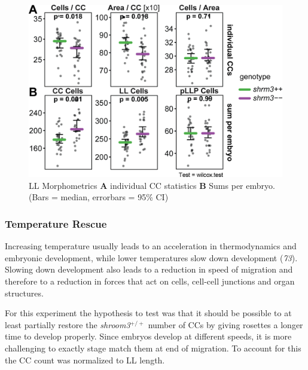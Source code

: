 \documentclass[11pt,singlespacinge,twoside]{reedthesis} %
\theoremstyle{definition}
\theoremstyle{definition}
\theoremstyle{definition}
\theoremstyle{remark}
\begin{document}
\begin{figure}[H]

{\centering \includegraphics[width=0.65\linewidth]{figures/results/01_morphometrics/ll_clusters} 

}

\caption[LL Morphometrics]{LL Morphometrics \textbf{A} individual CC statistics \textbf{B} Sums per embryo. (Bars = median, errorbars = 95\% CI)}\label{fig:llclus}
\end{figure}
\hypertarget{res-tempresc}{%
\subsubsection{Temperature Rescue}\label{res-tempresc}}

Increasing temperature usually leads to an acceleration in thermodynamics and embryonic development, while lower temperatures slow down development (\emph{73}). Slowing down development also leads to a reduction in speed of migration and therefore to a reduction in forces that act on cells, cell-cell junctions and organ structures.

For this experiment the hypothesis to test was that it should be possible to at least partially restore the \emph{shroom3}\(^{+/+}\) number of CCs by giving rosettes a longer time to develop properly. Since embryos develop at different speeds, it is more challenging to exactly stage match them at end of migration. To account for this the CC count was normalized to LL length.
\end{document}

